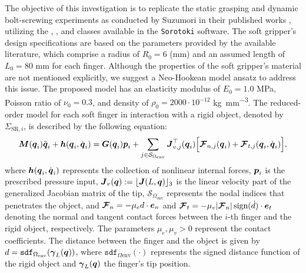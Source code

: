 The objective of this investigation is to replicate the static grasping and dynamic bolt-screwing experiments as conducted by Suzumori in their published works \cite{Suzumori1991, Suzumori1992}, utilizing the , , and  classes available in the \texttt{Sorotoki} software. The soft gripper's design specifications are based on the parameters provided by the available literature, which comprise a radius of $R_0 = 6$ (\si{\milli \meter}) and an assumed length of $L_0 = 80$ \si{\milli \meter} for each finger. Although the properties of the soft gripper's material are not mentioned explicitly, we suggest a Neo-Hookean model ansatz to address this issue. The proposed model has an elasticity modulus of $E_0 = 1.0$ \si{\mega \pascal}, Poisson ratio of $\nu_0 = 0.3$, and density of $\rho_0 = 2000 \cdot 10^{-12}$ \si{\kilo \gram \per \milli \metre \cubed}. The reduced-order model for each soft finger in interaction with a rigid object, denoted by $\Sigma_{\textrm{SR},i}$, is described by the following equation:
%
\begin{multline}
    \boldsymbol{M}({\boldsymbol{q}}_i) \ddot{{\boldsymbol{q}}}_i  + {\boldsymbol{h}}({\boldsymbol{q}}_i,{\dot{\boldsymbol{q}}}_i)  =  {\boldsymbol{G}}({\boldsymbol{q}}_i) {\boldsymbol{p}}_i +  \sum_{j\in \mathcal{S}_{\Omega_{\textrm{env}}}} {\boldsymbol{J}}_{v,j}^\top({\boldsymbol{q}}_i) \Big[ {\boldsymbol{\mathcal{F}}}_{{n},j}({\boldsymbol{q}}_i) + {\boldsymbol{\mathcal{F}}}_{{t,j}}({\boldsymbol{q}}_i,\dot{{\boldsymbol{q}}}_i)\Big],
    \label{eq:suzumori_fingermodel_lagrangian}
\end{multline}
%
where ${\boldsymbol{h}}({\boldsymbol{q}}_i,{\dot{\boldsymbol{q}}}_i)$ represents the collection of nonlinear internal forces, ${\boldsymbol{p}}_i$ is the prescribed pressure input, ${\boldsymbol{J}}_v({\boldsymbol{q}}):= \lfloor{\boldsymbol{J}}(L,{\boldsymbol{q}})\rfloor_3$ is the linear velocity part of the generalized Jacobian matrix of the tip, $\mathcal{S}_{\Omega_{\textrm{env}}}$ represents the nodal indices that penetrates the object, and $
{\boldsymbol{\mathcal{F}}}_{{n}} = -\mu_e d \cdot \boldsymbol{e}_n$ and ${\boldsymbol{\mathcal{F}}}_{{t}} = -\mu_v |{\boldsymbol{\mathcal{F}}}_{{n}}| \, \textrm{sign}(\dot{d}) \cdot \boldsymbol{e}_t$ 
denoting the normal and tangent contact forces between the $i$-th finger and the rigid object, respectively. The parameters $\mu_e, \mu_v > 0$ represent the contact coefficients. The distance between the finger and the object is given by $d = \texttt{sdf}_{\Omega_{\textrm{env}}}({\boldsymbol{\gamma}}_L({\boldsymbol{q}}))$, where $\texttt{sdf}_{\Omega{\textrm{env}}}(\cdot)$ represents the signed distance function of the rigid object and ${\boldsymbol{\gamma}}_L({\boldsymbol{q}})$ the finger's tip position. 


